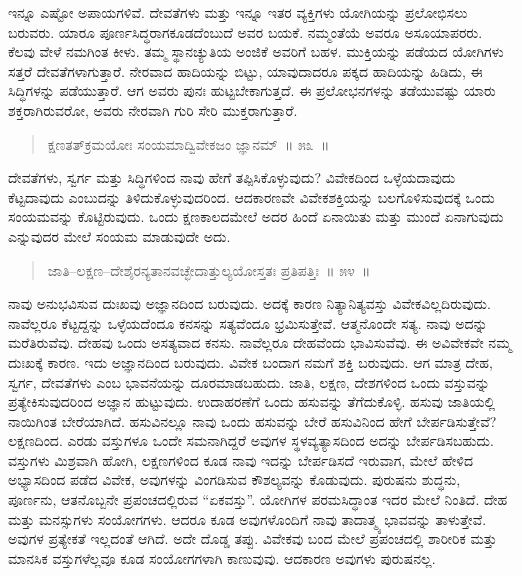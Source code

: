 ಇನ್ನೂ ಎಷ್ಟೋ ಅಪಾಯಗಳಿವೆ. ದೇವತೆಗಳು ಮತ್ತು ಇನ್ನೂ ಇತರ ವ್ಯಕ್ತಿಗಳು ಯೋಗಿಯನ್ನು ಪ್ರಲೋಭಿಸಲು ಬರುವರು. ಯಾರೂ ಪೂರ್ಣಸಿದ್ಧರಾಗಕೂಡದೆಂಬುದೆ ಅವರ ಬಯಕೆ. ನಮ್ಮಂತೆಯೆ ಅವರೂ ಅಸೂಯಾಪರರು. ಕೆಲವು ವೇಳೆ ನಮಗಿಂತ ಕೀಳು. ತಮ್ಮ ಸ್ಥಾನಚ್ಯುತಿಯ ಅಂಜಿಕೆ ಅವರಿಗೆ ಬಹಳ. ಮುಕ್ತಿಯನ್ನು ಪಡೆಯದ ಯೋಗಿಗಳು ಸತ್ತರೆ ದೇವತೆಗಳಾಗುತ್ತಾರೆ. ನೇರವಾದ ಹಾದಿಯನ್ನು ಬಿಟ್ಟು, ಯಾವುದಾದರೂ ಪಕ್ಕದ ಹಾದಿಯನ್ನು ಹಿಡಿದು, ಈ ಸಿದ್ಧಿಗಳನ್ನು ಪಡೆಯುತ್ತಾರೆ. ಆಗ ಅವರು ಪುನಃ ಹುಟ್ಟಬೇಕಾಗುತ್ತದೆ. ಈ ಪ್ರಲೋಭನಗಳನ್ನು ತಡೆಯುವಷ್ಟು ಯಾರು ಶಕ್ತರಾಗಿರುವರೋ, ಅವರು ನೇರವಾಗಿ ಗುರಿ ಸೇರಿ ಮುಕ್ತರಾಗುತ್ತಾರೆ. 

\vspace{-0.3cm}

\begin{verse}
ಕ್ಷಣತತ್​ಕ್ರಮಯೋಃ ಸಂಯಮಾದ್ವಿವೇಕಜಂ ಜ್ಞಾನಮ್​~॥ ೫೩~॥
\end{verse}

\vspace{-0.3cm}


ದೇವತೆಗಳು, ಸ್ವರ್ಗ ಮತ್ತು ಸಿದ್ಧಿಗಳಿಂದ ನಾವು ಹೇಗೆ ತಪ್ಪಿಸಿಕೊಳ್ಳುವುದು? ವಿವೇಕದಿಂದ ಒಳ್ಳೆಯದಾವುದು ಕೆಟ್ಟದಾವುದು ಎಂಬುದನ್ನು ತಿಳಿದುಕೊಳ್ಳುವುದರಿಂದ. ಆದಕಾರಣವೇ ವಿವೇಕಶಕ್ತಿಯನ್ನು ಬಲಗೊಳಿಸುವುದಕ್ಕೆ ಒಂದು ಸಂಯಮವನ್ನು ಕೊಟ್ಟಿರುವುದು. ಒಂದು ಕ್ಷಣಕಾಲದಮೇಲೆ ಅದರ ಹಿಂದೆ ಏನಾಯಿತು ಮತ್ತು ಮುಂದೆ ಏನಾಗುವುದು ಎನ್ನುವುದರ ಮೇಲೆ ಸಂಯಮ ಮಾಡುವುದೇ ಅದು. 

\vspace{-0.3cm}

\begin{verse}
ಜಾತಿ–ಲಕ್ಷಣ–ದೇಶೈರನ್ಯತಾನವಚ್ಛೇದಾತ್ತುಲ್ಯಯೋಸ್ತತಃ ಪ್ರತಿಪತ್ತಿಃ~॥ ೫೪~॥
\end{verse}

\vspace{-0.3cm}


ನಾವು ಅನುಭವಿಸುವ ದುಃಖವು ಅಜ್ಞಾನದಿಂದ ಬರುವುದು. ಅದಕ್ಕೆ ಕಾರಣ ನಿತ್ಯಾನಿತ್ಯವಸ್ತು ವಿವೇಕವಿಲ್ಲದಿರುವುದು. ನಾವೆಲ್ಲರೂ ಕೆಟ್ಟದ್ದನ್ನು ಒಳ್ಳೆಯದೆಂದೂ ಕನಸನ್ನು ಸತ್ಯವೆಂದೂ ಭ್ರಮಿಸುತ್ತೇವೆ. ಆತ್ಮನೊಂದೇ ಸತ್ಯ. ನಾವು ಅದನ್ನು ಮರೆತಿರುವೆವು. ದೇಹವು ಒಂದು ಅಸತ್ಯವಾದ ಕನಸು. ನಾವೆಲ್ಲರೂ ದೇಹವೆಂದು ಭಾವಿಸುವೆವು. ಈ ಅವಿವೇಕವೇ ನಮ್ಮ ದುಃಖಕ್ಕೆ ಕಾರಣ. ಇದು ಅಜ್ಞಾನದಿಂದ ಬರುವುದು. ವಿವೇಕ ಬಂದಾಗ ನಮಗೆ ಶಕ್ತಿ ಬರುವುದು. ಆಗ ಮಾತ್ರ ದೇಹ, ಸ್ವರ್ಗ, ದೇವತೆಗಳು ಎಂಬ ಭಾವನೆಯನ್ನು ದೂರಮಾಡಬಹುದು. ಜಾತಿ, ಲಕ್ಷಣ, ದೇಶಗಳಿಂದ ಒಂದು ವಸ್ತುವನ್ನು ಪ್ರತ್ಯೇಕಿಸುವುದರಿಂದ ಅಜ್ಞಾನ ಹುಟ್ಟುವುದು. ಉದಾಹರಣೆಗೆ ಒಂದು ಹಸುವನ್ನು ತೆಗೆದುಕೊಳ್ಳಿ. ಹಸುವು ಜಾತಿಯಲ್ಲಿ ನಾಯಿಗಿಂತ ಬೇರೆಯಾಗಿದೆ. ಹಸುವಿನಲ್ಲೂ ನಾವು ಒಂದು ಹಸುವನ್ನು ಬೇರೆ ಹಸುವಿನಿಂದ ಹೇಗೆ ಬೇರ್ಪಡಿಸುತ್ತೇವೆ? ಲಕ್ಷಣದಿಂದ. ಎರಡು ವಸ್ತುಗಳೂ ಒಂದೇ ಸಮನಾಗಿದ್ದರೆ ಅವುಗಳ ಸ್ಥಳವ್ಯತ್ಯಾಸದಿಂದ ಅದನ್ನು ಬೇರ್ಪಡಿಸಬಹುದು. ವಸ್ತುಗಳು ಮಿಶ್ರವಾಗಿ ಹೋಗಿ, ಲಕ್ಷಣಗಳಿಂದ ಕೂಡ ನಾವು ಇದನ್ನು ಬೇರ್ಪಡಿಸದೆ ಇರುವಾಗ, ಮೇಲೆ ಹೇಳಿದ ಅಭ್ಯಾಸದಿಂದ ಪಡೆದ ವಿವೇಕ, ಅವುಗಳನ್ನು ವಿಂಗಡಿಸುವ ಕೌಶಲ್ಯವನ್ನು ಕೊಡುವುದು. ಪುರುಷನು ಶುದ್ಧನು, ಪೂರ್ಣನು, ಆತನೊಬ್ಬನೇ ಪ್ರಪಂಚದಲ್ಲಿರುವ “ಏಕವಸ್ತು”. ಯೋಗಿಗಳ ಪರಮಸಿದ್ಧಾಂತ ಇದರ ಮೇಲೆ ನಿಂತಿದೆ. ದೇಹ ಮತ್ತು ಮನಸ್ಸುಗಳು ಸಂಯೋಗಗಳು. ಆದರೂ ಕೂಡ ಅವುಗಳೊಂದಿಗೆ ನಾವು ತಾದಾತ್ಮ್ಯ ಭಾವವನ್ನು ತಾಳುತ್ತೇವೆ. ಅವುಗಳ ಪ್ರತ್ಯೇಕತೆ ಇಲ್ಲದಂತೆ ಆಗಿದೆ. ಅದೇ ದೊಡ್ಡ ತಪ್ಪು. ವಿವೇಕವು ಬಂದ ಮೇಲೆ ಪ್ರಪಂಚದಲ್ಲಿ ಶಾರೀರಿಕ ಮತ್ತು ಮಾನಸಿಕ ವಸ್ತುಗಳೆಲ್ಲವೂ ಕೂಡ ಸಂಯೋಗಗಳಾಗಿ ಕಾಣುವುವು. ಆದಕಾರಣ ಅವುಗಳು ಪುರುಷನಲ್ಲ. 

